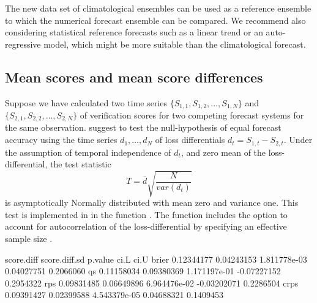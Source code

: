 \documentclass[article]{jss}
\begin{document}
The new data set of climatological ensembles can be used as a reference ensemble to which the numerical forecast ensemble can be compared.
We recommend also considering statistical reference forecasts such as a linear trend or an auto-regressive model, which might be more suitable than the climatological forecast.



\subsection{Mean scores and mean score differences}

Suppose we have calculated two time series $\{S_{1,1}, S_{1,2}, \dots, S_{1,N}\}$ and $\{S_{2,1}, S_{2,2}, \dots, S_{2,N}\}$ of verification scores for two competing forecast systems for the same observation.
\citet{diebold1995comparing} suggest to test the null-hypothesis of equal forecast accuracy using the time series $d_1, \dots, d_N$ of loss differentials $d_t = S_{1,t} - S_{2,t}$. 
Under the assumption of temporal independence of $d_t$, and zero mean of the loss-differential, the test statistic 
%
\begin{equation}
T = \bar{d}\sqrt{\frac{N}{var(d_t)}}
\end{equation}
%
is asymptotically Normally distributed with mean zero and variance one.
This test is implemented in  in the function .
The function includes the option to account for autocorrelation of the loss-differential by specifying an effective sample size .

\begin{Schunk}
\begin{Soutput}
      score.diff score.diff.sd      p.value        ci.L      ci.U
brier 0.12344177    0.04243153 1.811778e-03  0.04027751 0.2066060
qs    0.11158034    0.09380369 1.171197e-01 -0.07227152 0.2954322
rps   0.09831485    0.06649896 6.964476e-02 -0.03202071 0.2286504
crps  0.09391427    0.02399588 4.543379e-05  0.04688321 0.1409453
\end{Soutput}
\end{Schunk}
\end{document}
